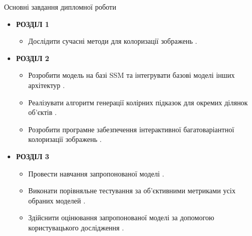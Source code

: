 \begin{frame}{Основні завдання дипломної роботи}
    \begin{itemize}
        \item \textbf{РОЗДІЛ 1}
            \begin{itemize}
                \item Дослідити сучасні методи для колоризації зображень .
            \end{itemize}
        \item \textbf{РОЗДІЛ 2}
            \begin{itemize}
                \item Розробити модель на базі SSM та інтегрувати базові моделі інших архітектур .
                \item Реалізувати алгоритм генерації колірних підказок для окремих ділянок об'єктів .
                \item Розробити програмне забезпечення інтерактивної багатоваріантної колоризації зображень .
            \end{itemize}
        \item \textbf{РОЗДІЛ 3}
            \begin{itemize}
                \item Провести навчання запропонованої моделі .
                \item Виконати порівняльне тестування за об'єктивними метриками усіх обраних моделей .
                \item Здійснити оцінювання запропонованої моделі за допомогою користувацького дослідження .
            \end{itemize}
    \end{itemize}
\end{frame}